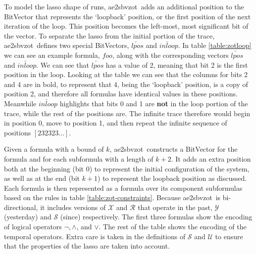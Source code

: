 \documentclass[a4paper,12pt]{article}
\newcommand{\aez}{ae2sbvzot}
\begin{document}
To model the lasso shape of runs, \aez\ adds an additional position to the
BitVector that represents the `loopback' position, or the first position of the
next iteration of the loop. This position becomes the left-most, most
significant bit of the vector. To separate the lasso from the initial portion of
the trace, \aez\ defines two special BitVectors, \(\overleftarrow{lpos}\) and
\(\overleftarrow{inloop}\). In table \ref{table:zotloop} we can see an example formula,
\(foo\), along with the corresponding vectors \(\overleftarrow{lpos}\) and
\(\overleftarrow{inloop}\). We can see that \(\overleftarrow{lpos}\) has a value
of 2, meaning that bit 2 is the first position in the loop. Looking at the table
we can see that the columns for bits 2 and 4 are in bold, to represent that 4,
being the `loopback' position, is a copy of position 2, and therefore all
formulas have identical values in these positions. Meanwhile
\(\overleftarrow{inloop}\) highlights that bits 0 and 1 are \textbf{not} in the
loop portion of the trace, while the rest of the positions are. The infinite
trace therefore would begin in position 0, move to position 1, and then repeat
the infinite sequence of positions \([232323\ldots]\).

Given a formula with a bound of \(k\), \aez\ constructs a BitVector for the
formula and for each subformula with a length of \(k{+}2\). It adds an extra
position both at the beginning (bit 0) to represent the initial configuration of
the system, as well as at the end (bit \(k{+}1\)) to represent the loopback
position as discussed. Each formula is then represented as a formula over its
component subformulas based on the rules in table \ref{table:zot-constraints}. Because
\aez\ is bi-directional, it includes versions of \(\mathcal{X}\) and
\(\mathcal{R}\) that operate in the past, \(\mathcal{Y}\) (yesterday) and
\(\mathcal{S}\) (since) respectively. The first three formulas show the encoding
of logical operators \(\neg, \land\), and \(\lor\). The rest of the table shows
the encoding of the temporal operators. Extra care is taken in the definitions
of \(\mathcal{S}\) and \(\mathcal{U}\) to ensure that the properties of the
lasso are taken into account.
\end{document}
